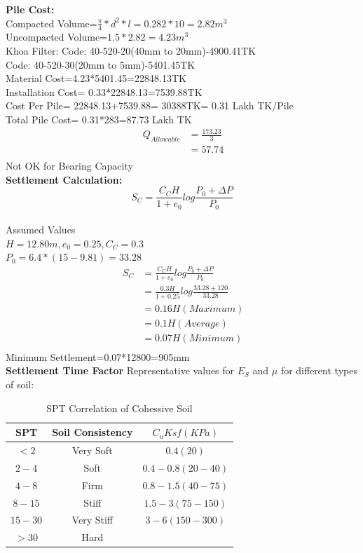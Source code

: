 \documentclass[12pt, a4paper]{article}
\begin{document}
\textbf{Pile Cost:}\\
Compacted Volume=$\frac{\pi}{4}*d^2*l=0.282*10=2.82m^3$\\
Uncompacted Volume=$ 1.5*2.82=4.23m^3$\\
Khoa Filter:
Code: 40-520-20(40mm to 20mm)-4900.41TK\\
Code: 40-520-30(20mm to 5mm)-5401.45TK\\
Material Cost=4.23*5401.45=22848.13TK\\
Installation Cost= 0.33*22848.13=7539.88TK\\
Cost Per Pile= 22848.13+7539.88= 30388TK= 0.31 Lakh TK/Pile\\
Total Pile Cost= 0.31*283=87.73 Lakh TK
\begin{align*}
    \ Q_{Allowable} &=\frac{173.23}{3}\\
    &= 57.74\\
\end{align*}
Not OK for Bearing Capacity\\
\textbf{Settlement Calculation:}
\[S_C=\frac{C_CH}{1+e_0}log\frac{P_0+\Delta P}{P_0}\]\\
Assumed Values\\
$H=12.80m, e_0=0.25, C_C=0.3$\\
$P_0=6.4*(15-9.81)=33.28$\\
\begin{align*}
\ S_C &=\frac{C_CH}{1+e_0}log\frac{P_0+\Delta P}{P_0}\\
  & =\frac{0.3H}{1+0.25}log\frac{33.28+120}{33.28}\\
  & =0.16H(Maximum)\\
  & =0.1H(Average)\\
  & =0.07H(Minimum)\\
\end{align*}
Minimum Settlement=0.07*12800=905mm\\
\textbf{Settlement Time Factor}
Representative values for $E_S$ and $\mu$ for different types of soil:\\
\begin{table}[ht]
    \centering
    \begin{tabular}{|c|c|c|}
    \hline
    \textbf{SPT} & \textbf{Soil Consistency} & \textbf{$C_uKsf(KPa)$}\\
    \hline
    $<2$ & Very Soft & $0.4(20)$\\
    \hline
    $2-4$ & Soft & $0.4-0.8(20-40)$\\
    \hline
    $4-8$ & Firm & $0.8-1.5(40-75)$\\
    \hline
    $8-15$ & Stiff & $1.5-3(75-150)$\\
    \hline
    $15-30$ & Very Stiff & $3-6(150-300)$\\
    \hline
    $>30$ & Hard & \\
    \hline
    \end{tabular}
    \caption{SPT Correlation of Cohessive Soil}
    \label{tab:my_label}
\end{table}
\end{document}
